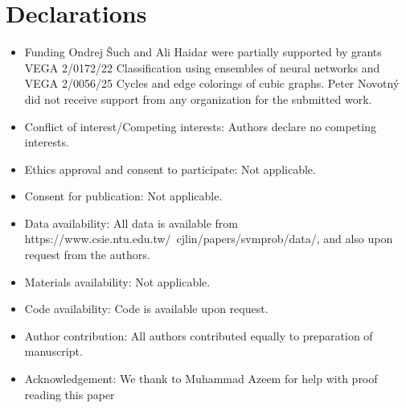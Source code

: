 \documentclass[preprint,12pt]{elsarticle}
\theoremstyle{thmstyleone}%
\theoremstyle{thmstyletwo}%
\theoremstyle{thmstylethree}%
\begin{document}
















\section*{Declarations}



\begin{itemize}
\item Funding Ondrej Šuch and Ali Haidar were  partially supported by grants VEGA 2/0172/22 Classification using ensembles of neural networks and VEGA 2/0056/25 Cycles and edge colorings of cubic graphs. Peter Novotný did not receive support from any organization for the submitted work.
\item Conflict of interest/Competing interests: Authors declare no competing interests.
\item Ethics approval and consent to participate: Not applicable.
\item Consent for publication: Not applicable.
\item Data availability: All data is available from https://www.csie.ntu.edu.tw/~cjlin/papers/svmprob/data/, and also upon request from the authors.
\item Materials availability: Not applicable.
\item Code availability: Code is available upon request.
\item Author contribution: All authors contributed equally to preparation of manuscript.
\item Acknowledgement: We thank to Muhammad Azeem for help with proof reading this paper
\end{itemize}
\end{document}
